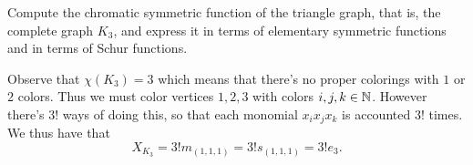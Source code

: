 \documentclass[12pt]{memoir}
\begin{document}
\begin{Ej}
    Compute the chromatic symmetric function of the triangle graph, that is, the complete graph $K_3$, and express it in terms of elementary symmetric functions and in terms of Schur functions.
\end{Ej}

\begin{ptcbr}
Observe that $\chi(K_3)=3$ which means that there's no proper colorings with $1$ or $2$ colors. Thus we must color vertices $1,2,3$ with colors $i,j,k\in\mathbb{N}$. However there's $3!$ ways of doing this, so that each monomial $x_ix_jx_k$ is accounted $3!$ times. We thus have that 
$$X_{K_3}=3!m_{(1,1,1)}=3!s_{(1,1,1)}=3!e_3.$$
\end{ptcbr}
\end{document}
